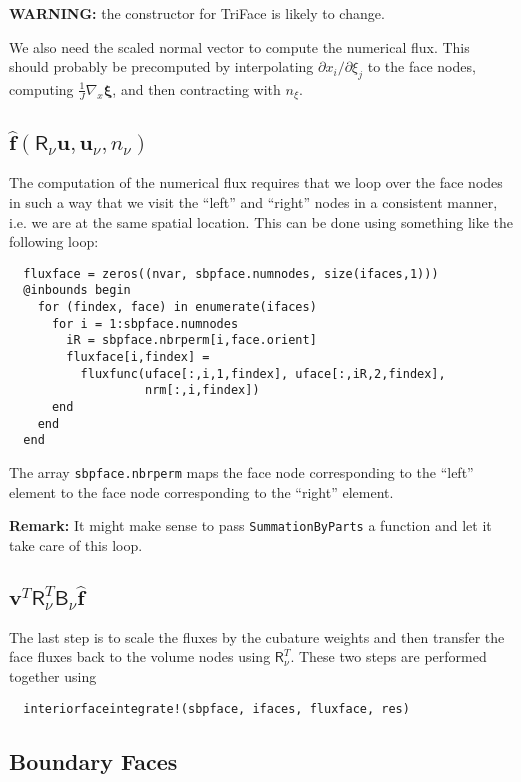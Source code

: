 \documentclass[11pt]{article} %
\makeatletter
\newcommand{\mat}[1]{\ensuremath{\mathsf{#1}}}
\newcommand{\B}[0]{\mat{B}}
\newcommand{\R}[0]{\mat{R}}
\newcommand{\ie}[0]{{i.e.\@}\xspace}
\makeatother
\begin{document}
\noindent\textbf{WARNING:} the constructor for TriFace is likely to change.

We also need the scaled normal vector to compute the numerical flux.  This
should probably be precomputed by interpolating $\partial x_{i}/\partial
\xi_{j}$ to the face nodes, computing $\frac{1}{J} \nabla_{x} \boldsymbol{\xi}$,
and then contracting with $n_\xi$.

\subsection*{$\hat{\bm{f}}(\R_{\nu} \bm{u}, \bm{u}_{\nu},n_{\nu})$}

The computation of the numerical flux requires that we loop over the face nodes
in such a way that we visit the ``left'' and ``right'' nodes in a consistent
manner, \ie we are at the same spatial location.  This can be done using
something like the following loop:
\begin{lstlisting}
  fluxface = zeros((nvar, sbpface.numnodes, size(ifaces,1)))
  @inbounds begin
    for (findex, face) in enumerate(ifaces)
      for i = 1:sbpface.numnodes
        iR = sbpface.nbrperm[i,face.orient]
        fluxface[i,findex] =
          fluxfunc(uface[:,i,1,findex], uface[:,iR,2,findex],
                   nrm[:,i,findex])
      end
    end
  end
\end{lstlisting}
The array \texttt{sbpface.nbrperm} maps the face node corresponding to the ``left''
element to the face node corresponding to the ``right'' element.

\noindent\textbf{Remark:} It might make sense to pass \texttt{SummationByParts} a function and let it take care of this loop.

\subsection*{$\bm{v}^{T} \R_{\nu}^{T} \B_{\nu} \hat{\bm{f}}$}

The last step is to scale the fluxes by the cubature weights and then transfer
the face fluxes back to the volume nodes using $\R_{\nu}^{T}$.  These two steps are performed together using
\begin{lstlisting}
  interiorfaceintegrate!(sbpface, ifaces, fluxface, res)
\end{lstlisting}

\subsection*{Boundary Faces}
\end{document}
